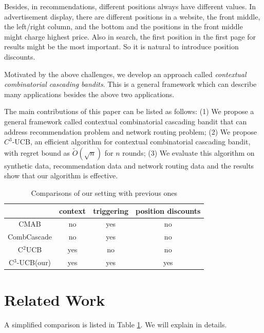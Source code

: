 \documentclass{article}
\begin{document}
Besides, in recommendations, different positions always have different values. In advertisement display, there are different positions in a website, the front middle, the left/right column, and the bottom and the positions in the front middle might charge highest price. Also in search, the first position in the first page for results might be the most important. So it is natural to introduce position discounts.

Motivated by the above challenges, we develop an approach called {\it contextual combinatorial cascading bandits}. This is a general framework which can describe many applications besides the above two applications.

The main contributions of this paper can be listed as follows: (1) We propose a general framework called contextual combinatorial cascading bandit that can address recommendation problem and network routing problem; (2) We propose $C^3$-UCB, an efficient algorithm for contextual combinatorial cascading bandit, with regret bound as $\tilde{O}(\sqrt{n})$ for $n$ rounds; (3) We evaluate this algorithm on synthetic data, recommendation data and network routing data and the results show that our algorithm is effective.

\begin{table}
	\renewcommand{\arraystretch}{1.1}
	\centering
	\begin{tabular}{|c|c|c|c|}
		\hline
		 &context &triggering &position discounts \\
		\hline
		CMAB &no &yes &no \\
		\hline
		CombCascade	&no &yes &no  \\
		\hline
		C$^2$UCB &yes &no &no  \\
		\hline
		C$^3$-UCB(our) &yes &yes &yes \\
		\hline
	\end{tabular}
	\caption{Comparisons of our setting with previous ones }
	\label{table:outline}
\end{table} 


\section{Related Work}

A simplified comparison is listed in Table \ref{table:outline}. We will explain in details.
\end{document}
